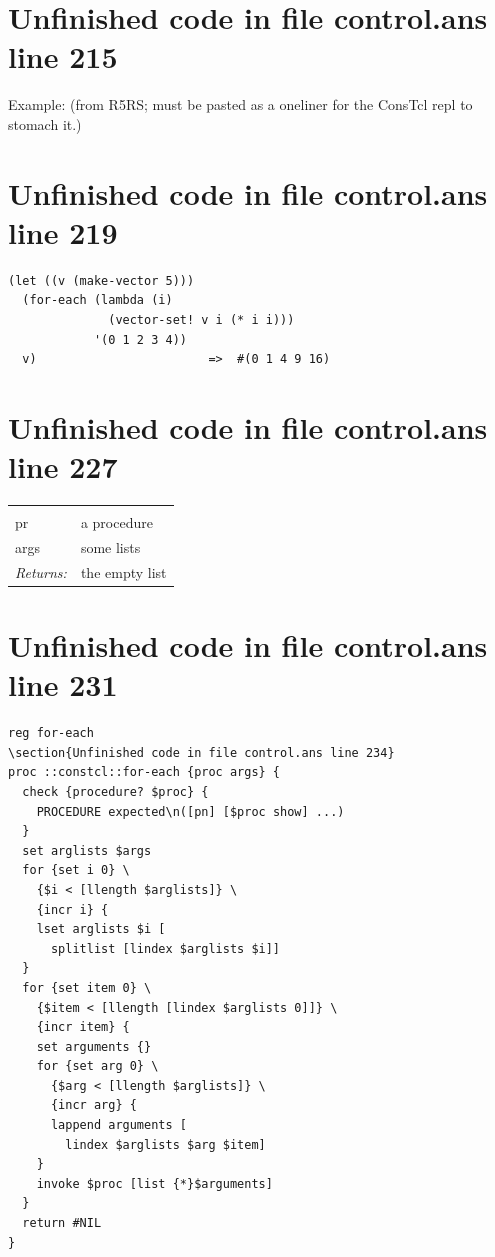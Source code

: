 \documentclass[twoside,9pt]{report}
\begin{document}
\section{Unfinished code in file control.ans line 215}


Example: (from R5RS; must be pasted as a oneliner for the ConsTcl repl to stomach it.)

\section{Unfinished code in file control.ans line 219}
\begin{verbatim}
(let ((v (make-vector 5)))
  (for-each (lambda (i)
              (vector-set! v i (* i i)))
            '(0 1 2 3 4))
  v)                        =>  #(0 1 4 9 16)
\end{verbatim}
\section{Unfinished code in file control.ans line 227}
\noindent\begin{tabular}{ |p{1.9cm} p{8cm}| }
\hline
\rowcolor[HTML]{CCCCCC} \multicolumn{2}{|l|}{\bf for-each (public)} \\
pr & a procedure \\
args & some lists \\
\textit{Returns:} & the empty list \\
\hline
\end{tabular}
\section{Unfinished code in file control.ans line 231}
\begin{lstlisting}
reg for-each
\section{Unfinished code in file control.ans line 234}
proc ::constcl::for-each {proc args} {
  check {procedure? $proc} {
    PROCEDURE expected\n([pn] [$proc show] ...)
  }
  set arglists $args
  for {set i 0} \
    {$i < [llength $arglists]} \
    {incr i} {
    lset arglists $i [
      splitlist [lindex $arglists $i]]
  }
  for {set item 0} \
    {$item < [llength [lindex $arglists 0]]} \
    {incr item} {
    set arguments {}
    for {set arg 0} \
      {$arg < [llength $arglists]} \
      {incr arg} {
      lappend arguments [
        lindex $arglists $arg $item]
    }
    invoke $proc [list {*}$arguments]
  }
  return #NIL
}
\end{lstlisting}
\end{document}
